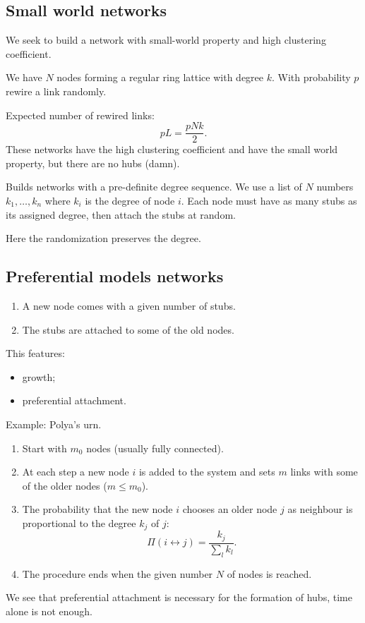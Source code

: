 \documentclass[a4paper,9pt]{extarticle}
\begin{document}
\begin{multicols*}{2}
\subsection{Small world networks}
We seek to build a network with small-world property and high clustering coefficient.
\begin{riquadro}
	We have $N$ nodes forming a regular ring lattice with degree $k$. With probability $p$ rewire a link randomly.
\end{riquadro}
Expected number of rewired links:
\begin{equation*}
	pL=\frac{pNk}{2}.
\end{equation*}
These networks have the high clustering coefficient and have the small world property, but there are no hubs (damn).
\begin{riquadro}
	Builds networks with a pre-definite degree sequence. We use a list of $N$ numbers $k_{1},\ldots,k_{n}$ where $k_{i}$ is the degree of node $i$. Each node must have as many stubs as its assigned degree, then attach the stubs at random.
\end{riquadro}
Here the randomization preserves the degree.
\subsection{Preferential models networks}
\begin{riquadro}
	\begin{enumerate}
		\item A new node comes with a given number of stubs.
		\item The stubs are attached to some of the old nodes.
	\end{enumerate}
\end{riquadro}
	This features:
\begin{itemize}
	\item growth;
	\item preferential attachment.
\end{itemize}
Example: Polya's urn. 
\begin{riquadro}
	\begin{enumerate}
		\item Start with $m_{0}$ nodes (usually fully connected).
		\item At each step a new node $i$ is added to the system and sets $m$ links with some of the older nodes ($m\leq m_{0}$).
		\item The probability that the new node $i$ chooses an older node $j$ as neighbour is proportional to the degree $k_{j}$ of $j$:
		\begin{equation*}
			\Pi(i\leftrightarrow j)=\frac{k_{j}}{\sum_lk_l}.
		\end{equation*}
		\item The procedure ends when the given number $N$ of nodes is reached.
	\end{enumerate}
\end{riquadro}
We see that preferential attachment is necessary for the formation of hubs, time alone is not enough.

\end{multicols*}
\end{document}
